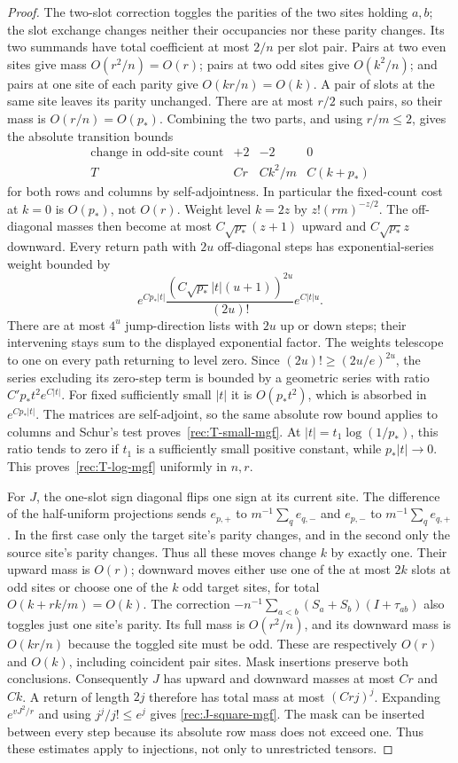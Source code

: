 \begin{proof}
The two-slot correction toggles the parities of the two sites holding
$a,b$; the slot exchange changes neither their occupancies nor these
parity changes.  Its two summands have total coefficient at most $2/n$
per slot pair.  Pairs at two even sites give mass $O(r^2/n)=O(r)$;
pairs at two odd sites give $O(k^2/n)$; and pairs at one site of each
parity give $O(kr/n)=O(k)$.  A pair of slots at the same site leaves
its parity unchanged.  There are at most $r/2$ such pairs, so their
mass is $O(r/n)=O(p_*)$.  Combining the two parts, and using
$r/m\le2$, gives the absolute transition bounds
\[
 \begin{array}{c|ccc}
 \text{change in odd-site count}&+2&-2&0\\ \hline
 T&Cr&Ck^2/m&C(k+p_*)
 \end{array}
\]
for both rows and columns by self-adjointness.  In particular the
fixed-count cost at $k=0$ is $O(p_*)$, not $O(r)$.
Weight level $k=2z$ by
$z!(rm)^{-z/2}$.  The off-diagonal masses then become at most
$C\sqrt{p_*}(z+1)$ upward and $C\sqrt{p_*}z$ downward.
Every return path with $2u$ off-diagonal steps has exponential-series
weight bounded by
\[
 e^{Cp_*|t|}
 \frac{(C\sqrt{p_*}|t|(u+1))^{2u}}{(2u)!}
 e^{C|t|u}.
\]
There are at most $4^u$ jump-direction lists with $2u$ up or down
steps; their intervening stays sum to the displayed exponential factor.
The weights telescope to one on every path returning to level zero.
Since $(2u)!\ge(2u/e)^{2u}$, the series excluding its zero-step term
is bounded by a geometric series with ratio
$C'p_*t^2e^{C|t|}$.  For fixed sufficiently small $|t|$ it is
$O(p_*t^2)$, which is absorbed in $e^{Cp_*|t|}$.
The matrices are self-adjoint, so the same absolute row bound applies to
columns and Schur's test proves~\eqref{rec:T-small-mgf}.
At $|t|=t_1\log(1/p_*)$, this ratio tends to zero if $t_1$ is a
sufficiently small positive constant, while $p_*|t|\to0$.
This proves~\eqref{rec:T-log-mgf} uniformly in $n,r$.

For $J$, the one-slot sign diagonal flips one sign at its current
site.  The difference of the half-uniform projections sends
$e_{p,+}$ to $m^{-1}\sum_qe_{q,-}$ and $e_{p,-}$ to
$m^{-1}\sum_qe_{q,+}$.  In the first case only the target site's
parity changes, and in the second only the source site's parity
changes.  Thus all these moves change $k$ by exactly one.  Their
upward mass is $O(r)$; downward moves either use one of the at most
$2k$ slots at odd sites or choose one of the $k$ odd target sites,
for total $O(k+rk/m)=O(k)$.
The correction $-n^{-1}\sum_{a<b}(S_a+S_b)(I+\tau_{ab})$
also toggles just one site's parity.  Its full mass is $O(r^2/n)$,
and its downward mass is $O(kr/n)$ because the toggled site must be
odd.  These are respectively $O(r)$ and $O(k)$, including coincident
pair sites.  Mask insertions preserve both conclusions.
Consequently $J$ has upward and downward masses at most $Cr$ and
$Ck$.  A return of length $2j$
therefore has total mass at most $(Crj)^j$.  Expanding
$e^{vJ^2/r}$ and using $j^j/j!\le e^j$ gives
\eqref{rec:J-square-mgf}.  The mask can be inserted between every
step because its absolute row mass does not exceed one.  Thus these
estimates apply to injections, not only to unrestricted tensors.
\end{proof}

